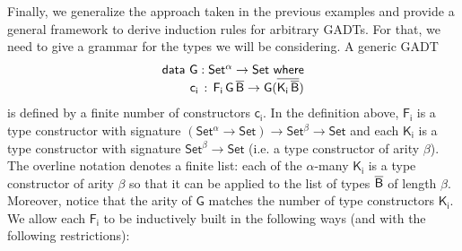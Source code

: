 \documentclass[9pt]{entcs}
\begin{document}
Finally, we generalize the approach taken in the previous examples
and provide a general framework to derive induction rules for arbitrary GADTs.
For that, we need to give a grammar for the types we will be considering.
A generic GADT
\begin{equation*}
\begin{array}{l}
\mathsf{data\ G : Set^\alpha \to Set\ where}\\
\mathsf{\;\;\;\;\;\;\;\;c_i\, :\, F_i\,G\,\overline{B} \to G (\overline{K_i\,\overline{B}})}
\end{array}
\end{equation*}
is defined by a finite number of constructors $\mathsf{c_i}$.
In the definition above, $\mathsf{F_i}$ is a type constructor with signature $\mathsf{(Set^{\alpha} \to Set) \to Set^{\beta} \to Set}$
and each $\mathsf{K_i}$ is a type constructor with signature $\mathsf{Set^{\beta} \to Set}$
(i.e. a type constructor of arity $\mathsf{\beta}$).
The overline notation denotes a finite list:
each of the $\mathsf{\alpha}$-many $\mathsf{K_i}$ is a type constructor of arity $\mathsf{\beta}$
so that it can be applied to the list of types $\mathsf{\overline{B}}$ of length $\mathsf{\beta}$.
Moreover, notice that the arity of $\mathsf{G}$ matches the number of type constructors $\mathsf{K_i}$.
We allow each $\mathsf{F_i}$ to be inductively built in the following ways (and with the following restrictions):
\end{document}

